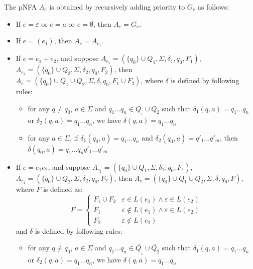 \documentclass[sigplan,review,anonymous]{acmart}\settopmatter{printfolios=true,printccs=false,printacmref=false}
\begin{document}
The pNFA $A_e$ is obtained by recursively adding priority to $G_e$ as follows:
\begin{itemize}
  \item If $e = \varepsilon$ or $e = a$ or $e = \emptyset$, then $A_e = G_e$.
  
  \item If $e = (e_1)$, then $A_e = A_{e_1}$.
  
  \item If $e = e_1 + e_2$, and suppose $A_{e_1} = (\{ q_0 \} \cup Q_1,
  \Sigma, \delta_1, q_0, F_1)$, $A_{e_2} = (\{ q_0 \} \cup Q_2, \Sigma,
  \delta_2, q_0, F_2)$, then $A_e = (\{ q_0 \} \cup Q_1 \cup Q_2, \Sigma,
  \delta, q_0, F_1 \cup F_2)$, where $\delta$ is defined by following rules:
  \begin{itemize}
    \item for any $q \neq q_0$, $a \in \Sigma$ and $q_1 \ldots q_n \in
    \overline{Q_{_1}} \cup \overline{Q_2}$ such that $\delta_1 (q, a) = q_1
    \ldots q_n$ or $\delta_2 (q, a) = q_1 \ldots q_n$, we have $\delta (q, a)
    = q_1 \ldots q_n$
    
    \item for any $a \in \Sigma$, if $\delta_1 (q_0, a) = q_1 \ldots q_n$ and
    $\delta_2 (q_0, a) = q'_1 \ldots q'_m$, then $\delta (q_0, a) = q_1 \ldots
    q_n q'_1 \ldots q'_m$
  \end{itemize}
  \item If $e = e_1 e_2$, and suppose $A_{e_1} = (\{ q_0 \} \cup Q_1, \Sigma,
  \delta_1, q_0, F_1)$, $A_{e_2} = (\{ q_0 \} \cup Q_2, \Sigma, \delta_2,
  q_0, F_2)$, then $A_e = (\{ q_0 \} \cup Q_1 \cup Q_2, \Sigma, \delta, q_0,
  F)$, where $F$ is defined as:
  \[ F = \left\{ \begin{array}{ll}
       F_1 \cup F_2 & \varepsilon \in L (e_1) \wedge \varepsilon \in L (e_2)\\
       F_1 & \varepsilon \nin L (e_1) \wedge \varepsilon \in L (e_2)\\
       F_2 & \varepsilon \nin L (e_2)
     \end{array} \right. \]
  and $\delta$ is defined by following rules:
  \begin{itemize}
    \item for any $q \neq q_0$, $a \in \Sigma$ and $q_1 \ldots q_n \in
    \overline{Q_{_1}} \cup \overline{Q_2}$ such that $\delta_1 (q, a) = q_1
    \ldots q_n$ or $\delta_2 (q, a) = q_1 \ldots q_n$, we have $\delta (q, a)
    = q_1 \ldots q_n$
    

\end{itemize}
\end{itemize}
\end{document}

